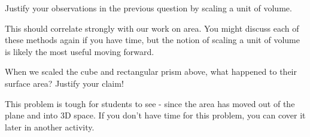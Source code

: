 \documentclass[nooutcomes]{ximera}
\begin{document}
\begin{problem}
Justify your observations in the previous question by scaling a unit of volume.
\begin{instructorNotes}
This should correlate strongly with our work on area.  You might discuss each of these methods again if you have time, but the notion of scaling a unit of volume is likely the most useful moving forward.
\end{instructorNotes}
\end{problem}

\begin{problem}
When we scaled the cube and rectangular prism above, what happened to their surface area?  Justify your claim!

\begin{instructorNotes}
This problem is tough for students to see - since the area has moved out of the plane and into 3D space.  If you don't have time for this problem, you can cover it later in another activity.
\end{instructorNotes}
\end{problem}
\end{document}
